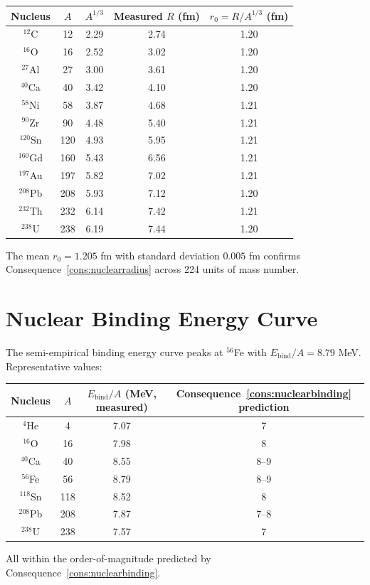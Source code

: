 \documentclass[11pt,twocolumn,a4paper]{article}
\theoremstyle{axiomstyle}
\theoremstyle{conseqstyle}
\theoremstyle{definition}
\theoremstyle{remark}
\begin{document}
\begin{center}
\begin{tabular}{c|c|c|c|c}
\toprule
Nucleus & $A$ & $A^{1/3}$ & Measured $R$ (fm) & $r_{0}=R/A^{1/3}$ (fm)\\
\midrule
$^{12}$C   & 12  & 2.29 & 2.74 & 1.20 \\
$^{16}$O   & 16  & 2.52 & 3.02 & 1.20 \\
$^{27}$Al  & 27  & 3.00 & 3.61 & 1.20 \\
$^{40}$Ca  & 40  & 3.42 & 4.10 & 1.20 \\
$^{58}$Ni  & 58  & 3.87 & 4.68 & 1.21 \\
$^{90}$Zr  & 90  & 4.48 & 5.40 & 1.21 \\
$^{120}$Sn & 120 & 4.93 & 5.95 & 1.21 \\
$^{160}$Gd & 160 & 5.43 & 6.56 & 1.21 \\
$^{197}$Au & 197 & 5.82 & 7.02 & 1.21 \\
$^{208}$Pb & 208 & 5.93 & 7.12 & 1.20 \\
$^{232}$Th & 232 & 6.14 & 7.42 & 1.21 \\
$^{238}$U  & 238 & 6.19 & 7.44 & 1.20 \\
\bottomrule
\end{tabular}
\end{center}

The mean $r_{0}=1.205$ fm with standard deviation $0.005$ fm confirms Consequence~\ref{cons:nuclearradius} across 224 units of mass number.

\section{Nuclear Binding Energy Curve}
\label{sec:bindingcurve}

The semi-empirical binding energy curve \citep{audi2017} peaks at $^{56}$Fe with $E_{\text{bind}}/A=8.79$ MeV. Representative values:
\begin{center}
\begin{tabular}{c|c|c|c}
\toprule
Nucleus & $A$ & $E_{\text{bind}}/A$ (MeV, measured) & Consequence~\ref{cons:nuclearbinding} prediction\\
\midrule
$^{4}$He  & 4   & 7.07 & 7 \\
$^{16}$O  & 16  & 7.98 & 8 \\
$^{40}$Ca & 40  & 8.55 & 8--9 \\
$^{56}$Fe & 56  & 8.79 & 8--9 \\
$^{118}$Sn & 118 & 8.52 & 8 \\
$^{208}$Pb & 208 & 7.87 & 7--8 \\
$^{238}$U & 238 & 7.57 & 7 \\
\bottomrule
\end{tabular}
\end{center}
All within the order-of-magnitude predicted by Consequence~\ref{cons:nuclearbinding}.
\end{document}
